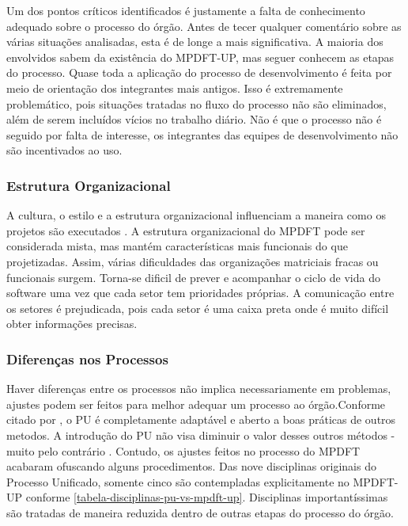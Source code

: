 \documentclass[
	article,			%
	11pt,				%
	oneside,			%
	a4paper,			%
	english,			%
	brazil,				%
	sumario=tradicional
	]{abntex2}
\begin{document}
Um dos pontos críticos identificados é justamente a falta de conhecimento
adequado sobre o processo do órgão. Antes de tecer qualquer comentário sobre as
várias situações analisadas, esta é de longe a mais significativa. A maioria dos
envolvidos sabem da existência do MPDFT-UP, mas seguer conhecem as etapas do
processo. Quase toda a aplicação do processo de desenvolvimento é feita por meio
de orientação dos integrantes mais antigos. Isso é extremamente problemático,
pois situações tratadas no fluxo do processo não são eliminados, além de serem
incluídos vícios no trabalho diário. Não é que o processo não é seguido por
falta de interesse, os integrantes das equipes de desenvolvimento não são
incentivados ao uso.

\subsubsection{Estrutura Organizacional}

A cultura, o estilo e a estrutura organizacional influenciam a maneira como os
projetos são executados \cite[pag. 30]{pmi2008pmbok}. A estrutura organizacional
do MPDFT pode ser considerada mista, mas mantém características mais funcionais
do que projetizadas. Assim, várias dificuldades das organizações matriciais
fracas ou funcionais surgem. Torna-se dificil de prever e acompanhar o ciclo de
vida do software uma vez que cada setor tem prioridades próprias. A comunicação
entre os setores é prejudicada, pois cada setor é uma caixa preta onde é muito
difícil obter informações precisas.

\subsubsection{Diferenças nos Processos}

Haver diferenças entre os processos não implica necessariamente em problemas,
ajustes podem ser feitos para melhor adequar um processo ao órgão.Conforme
citado por , o PU é completamente adaptável e
aberto a boas práticas de outros metodos. A introdução do PU não visa diminuir o
valor desses outros métodos - muito pelo contrário \cite{larman2007utilizando}.
Contudo, os ajustes feitos no processo do MPDFT acabaram ofuscando alguns
procedimentos. Das nove disciplinas originais do Processo Unificado, somente
cinco são contempladas explicitamente no MPDFT-UP conforme
\autoref{tabela-disciplinas-pu-vs-mpdft-up}. Disciplinas importantíssimas são
tratadas de maneira reduzida dentro de outras etapas do processo do órgão.
\end{document}
